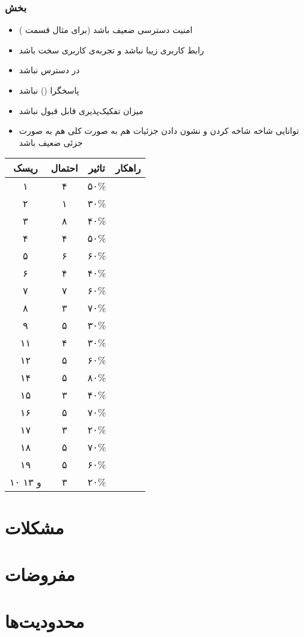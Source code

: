 \subsubsection{بخش }
\begin{itemize}
\item[\risk]
امنیت دسترسی ضعیف باشد (برای مثال قسمت )

\item[\risk]
رابط کاربری زیبا نباشد و تجربه‌ی کاربری سخت باشد

\item[\risk]
در دسترس نباشد

\item[\risk]
پاسخگرا () نباشد

\item[\risk]
میزان تفکیک‌پذیری قابل قبول نباشد

\item[\risk]
توانایی شاخه شاخه کردن و نشون دادن جزئیات هم به صورت کلی هم به صورت جزئی ضعیف باشد
\end{itemize}

\begin{table}[H]
\begin{center}
\begin{tabular}{|c|c|c|c|}
\hline
ریسک &
احتمال &
تاثیر &
راهکار \\
\hline
\hline

۱ &
۴ &
۵۰\%&
\\
\hline
۲ &
۱ &
۳۰\%&
\\
\hline
۳ &
۸ &
۴۰\%&
\\
\hline
۴ &
۴ &
۵۰\%&
\\
\hline
۵ &
۶ &
۶۰\% &
\\
\hline
۶ &
۴ &
۴۰\%&
\\
\hline
۷ &
۷ &
۶۰\%&
\\
\hline
۸ &
۳ &
۷۰\%&
\\
\hline
۹ &
۵ &
۳۰\%&
\\
\hline
۱۱ &
۴ &
۳۰\%&
\\
\hline
۱۲ &
۵ &
۶۰\%&
\\
\hline
۱۴ &
۵ &
۸۰\%&
\\
\hline
۱۵ &
۳ &
۴۰\%&
\\
\hline
۱۶ &
۵ &
۷۰\%&
\\
\hline
۱۷ &
۳ &
۲۰\%&
\\
\hline
۱۸ &
۵ &
۷۰\%&
\\
\hline
۱۹ &
۵&
۶۰\%&
\\
\hline

۱۰ و ۱۳ &
۳&
۲۰\%&
\\
\hline

\end{tabular}
\end{center}
\end{table}
\section{مشکلات }

\section{مفروضات }

\section{محدودیت‌ها }

